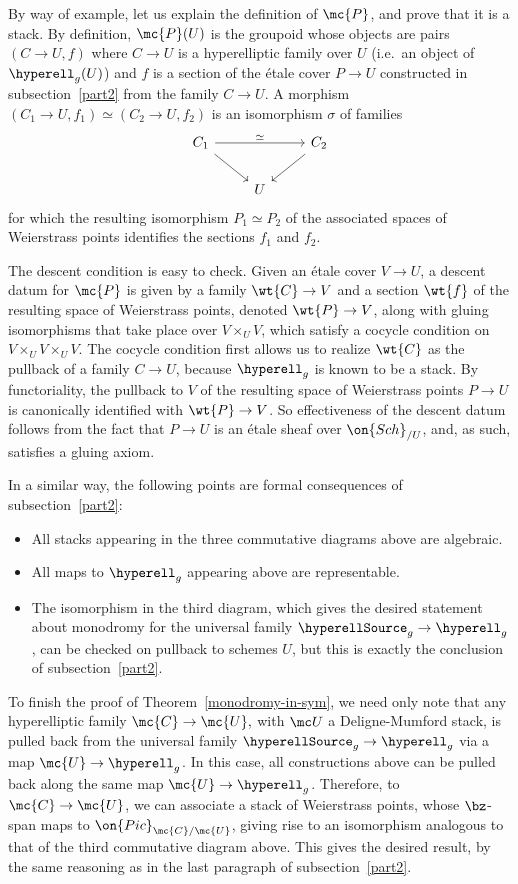 \begin{remark} By way of example, let us explain the definition of $\mc{P}$, and prove that it is a stack. By definition, $\mc{P}(U)$ is the groupoid whose objects are pairs $(C \to U, f)$ where $C \to U$ is a hyperelliptic family over $U$ (i.e.\ an object of $\hyperell_g(U)$) and $f$ is a section of the \'etale cover $P \to U$ constructed in subsection~\ref{part2} from the family $C \to U$. A morphism $(C_1 \to U, f_1) \simeq (C_2 \to U, f_2)$ is an isomorphism $\sigma$ of families
\[
\begin{tikzcd}
C_1 \ar{rr}{\simeq} \ar{dr} && C_2 \ar{dl} \\
& U
\end{tikzcd}
\]
for which the resulting isomorphism $P_1 \simeq P_2$ of the associated spaces of Weierstrass points identifies the sections $f_1$ and $f_2$.

The descent condition is easy to check. Given an \'etale cover $V \to U$, a descent datum for $\mc{P}$ is given by a family $\wt{C} \to V$ and a section $\wt{f}$ of the resulting space of Weierstrass points, denoted $\wt{P} \to V$, along with gluing isomorphisms that take place over $V \times_U V$, which satisfy a cocycle condition on $V \times_U V \times_U V$. The cocycle condition first allows us to realize $\wt{C}$ as the pullback of a family $C \to U$, because $\hyperell_g$ is known to be a stack. By functoriality, the pullback to $V$ of the resulting space of Weierstrass points $P \to U$ is canonically identified with $\wt{P} \to V$. So effectiveness of the descent datum follows from the fact that $P \to U$ is an \'etale sheaf over $\on{Sch}_{/U}$, and, as such, satisfies a gluing axiom.
\end{remark}
In a similar way, the following points are formal consequences of subsection~\ref{part2}:
\begin{itemize}
	\item All stacks appearing in the three commutative diagrams above are algebraic.
	\item All maps to $\hyperell_g$ appearing above are representable.
	\item The isomorphism in the third diagram, which gives the desired statement about monodromy for the universal family $\hyperellSource_g \to \hyperell_g$, can be checked on pullback to schemes $U$, but this is exactly the conclusion of subsection~\ref{part2}.
\end{itemize}

To finish the proof of Theorem~\ref{monodromy-in-sym}, we need only note that any hyperelliptic family $\mc{C} \to \mc{U},$ with $\mc U$ a Deligne-Mumford stack, is pulled back from the universal family $\hyperellSource_g \to \hyperell_g$ via a map $\mc{U} \to \hyperell_g$. In this case, all constructions above can be pulled back along the same map $\mc{U} \to \hyperell_g$. Therefore, to $\mc{C} \to \mc{U}$, we can associate a stack of Weierstrass points, whose $\bz$-span maps to $\on{Pic}_{\mc{C} / \mc{U}}$, giving rise to an isomorphism analogous to that of the third commutative diagram above. This gives the desired result, by the same reasoning as in the last paragraph of subsection~\ref{part2}.

